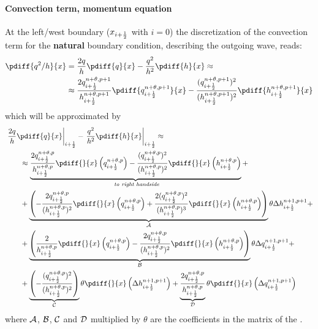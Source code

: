\paragraph*{Convection term, momentum equation}
At the left/west boundary ($x_{i+\frac{1}{2}}$ with $i=0$) the discretization of the convection term for the \textbf{natural} boundary condition, describing the outgoing wave, reads:
\begin{align}
    \pdiff{q^2/h}{x} & = \frac{2q}{h}\pdiff{q}{x} - \frac{q^2}{h^2}\pdiff{h}{x} \approx
    \nonumber \\*
    & \approx \frac{2q^{n+\theta, p+1}_{i+\half}}{h^{n+\theta, p+1}_{i+\half}}\pdiff{q^{n+\theta, p+1}_{i+\half}}{x} - \frac{(q^{n+\theta, p+1}_{i+\half})^2}{(h^{n+\theta, p+1}_{i+\half})^2}\pdiff{h^{n+\theta, p+1}_{i+\half}}{x}
\end{align}
which will be approximated by
\begin{align}
    & \left. \frac{2q}{h}\pdiff{q}{x}\right|_{i+\half} - \left. \frac{q^2}{h^2}\pdiff{h}{x}\right|_{i+\half}
    \approx
    \\
    & \qquad \approx \underbrace{\frac{2q^{n+\theta, p}_{i+\half}}{ h^{n+\theta, p}_{i+\half}} \pdiff{}{x}\left( q^{n+\theta, p}_{i+\half} \right)
        - \frac{(q^{n+\theta, p}_{i+\half})^2}{(h^{n+\theta, p}_{i+\half})^2} \pdiff{}{x} \left( h^{n+\theta, p}_{i+\half} \right)}_{\textit{ to right handside}} +
    \nonumber \\
    & \qquad + \underbrace{\left( -\frac{2q^{n+\theta, p}_{i+\half}}{ (h^{n+\theta, p}_{i+\half})^2}  \pdiff{}{x} \left( q^{n+\theta,p}_{i+\half}  \right)
        + \frac{2(q^{n+\theta, p}_{i+\half})^2}{(h^{n+\theta, p}_{i+\half})^3} \pdiff{}{x} \left( h^{n+\theta,p} _{i+\half} \right)
        \right)}_{\cal A} \theta \Delta h^{n+1, p+1}_{i+\half} +
    \nonumber \\
    & \qquad + \underbrace{\left( \frac{2}{ h^{n+\theta, p}_{i+\half}} \pdiff{}{x} \left( q^{n+\theta, p}_{i+\half} \right)
        -  \frac{2q^{n+\theta, p}_{i+\half}}{(h^{n+\theta, p}_{i+\half})^2} \pdiff{}{x} \left( h^{n+\theta, p}_{i+\half} \right)
        \right)}_{\cal B} \theta \Delta q^{n+1, p+1}_{i+\half} +
    \nonumber \\
    &
    \qquad + \underbrace{\left(- \frac{(q^{n+\theta, p}_{i+\half})^2}{(h^{n+\theta, p}_{i+\half})^2} \right)}_{\cal C} \theta \pdiff{}{x} \left( \Delta h^{n+1, p+1}_{i+\half} \right)
    + \underbrace{\frac{2q^{n+\theta, p}_{i+\half}}{ h^{n+\theta, p}_{i+\half}}}_{\cal D} \theta \pdiff{}{x} \left(  \Delta q^{n+1, p+1}_{i+\half} \right)
\end{align}
where $\cal{A}$, $\cal{B}$, $\cal{C}$ and $\cal{D}$ multiplied by $\theta$ are the coefficients in the matrix of the \deltaformulation.
